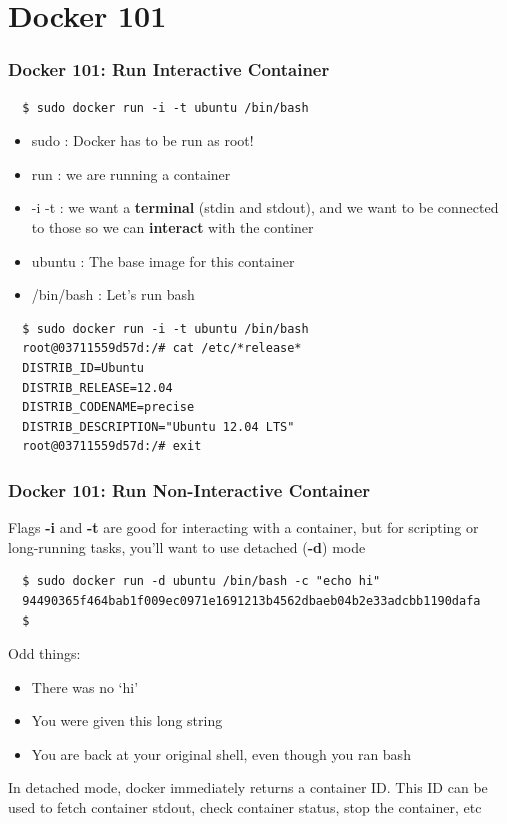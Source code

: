 \documentclass[xcolor=dvipsnames]{beamer}
\newcommand{\cpause}{}
\begin{document}
\section{Docker 101}
\begin{frame}[fragile]
  \frametitle{Docker 101: Run Interactive Container}

  \begin{lstlisting}
  $ sudo docker run -i -t ubuntu /bin/bash
  \end{lstlisting}
  \cpause

  \begin{itemize}
  \item sudo : Docker has to be run as root! \cpause
  \item run : we are running a container \cpause
  \item -i -t : we want a \textbf{terminal} (stdin and stdout), and we want to be connected to those so we can \textbf{interact} with the continer \cpause
  \item ubuntu : The base image for this container \cpause
  \item /bin/bash : Let's run bash \cpause
  \end{itemize}


  \begin{lstlisting}
  $ sudo docker run -i -t ubuntu /bin/bash
  root@03711559d57d:/# cat /etc/*release*
  DISTRIB_ID=Ubuntu
  DISTRIB_RELEASE=12.04
  DISTRIB_CODENAME=precise
  DISTRIB_DESCRIPTION="Ubuntu 12.04 LTS"
  root@03711559d57d:/# exit
  \end{lstlisting}

\end{frame}


\begin{frame}[fragile]
  \frametitle{Docker 101: Run Non-Interactive Container}

  Flags \textbf{-i} and \textbf{-t} are good for interacting with a container, but for
  scripting or long-running tasks, you'll want to use detached (\textbf{-d}) mode

  \cpause
  \begin{lstlisting}
  $ sudo docker run -d ubuntu /bin/bash -c "echo hi" 
  94490365f464bab1f009ec0971e1691213b4562dbaeb04b2e33adcbb1190dafa
  $
  \end{lstlisting}

  \cpause
  Odd things:
  \begin{itemize}
  \item There was no `hi' \cpause
  \item You were given this long string \cpause
  \item You are back at your original shell, even though you ran bash \cpause
  \end{itemize}

  In detached mode, docker immediately returns a container ID. This ID can 
  be used to fetch container stdout, check container status, stop the container, etc

\end{frame}
\end{document}
